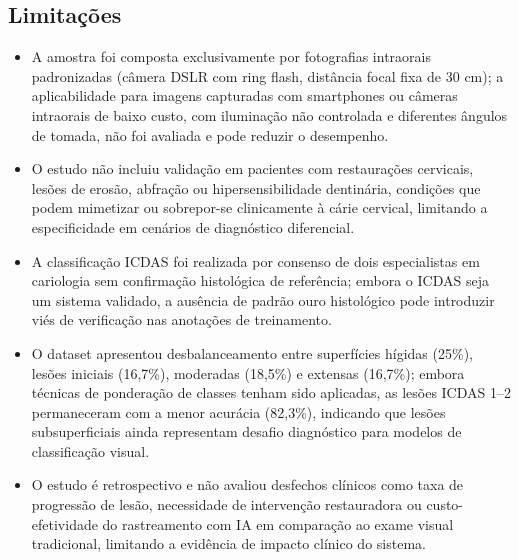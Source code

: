 \subsection{Limitações}
\begin{itemize}
  \item A amostra foi composta exclusivamente por fotografias
        intraorais padronizadas (câmera DSLR com ring flash, distância
        focal fixa de 30 cm); a aplicabilidade para imagens capturadas
        com smartphones ou câmeras intraorais de baixo custo, com
        iluminação não controlada e diferentes ângulos de tomada, não
        foi avaliada e pode reduzir o desempenho.
  \item O estudo não incluiu validação em pacientes com restaurações
        cervicais, lesões de erosão, abfração ou hipersensibilidade
        dentinária, condições que podem mimetizar ou sobrepor-se
        clinicamente à cárie cervical, limitando a especificidade
        em cenários de diagnóstico diferencial.
  \item A classificação ICDAS foi realizada por consenso de dois
        especialistas em cariologia sem confirmação histológica de
        referência; embora o ICDAS seja um sistema validado, a
        ausência de padrão ouro histológico pode introduzir viés de
        verificação nas anotações de treinamento.
  \item O dataset apresentou desbalanceamento entre superfícies
        hígidas (25\%), lesões iniciais (16,7\%), moderadas (18,5\%)
        e extensas (16,7\%); embora técnicas de ponderação de classes
        tenham sido aplicadas, as lesões ICDAS 1--2 permaneceram com
        a menor acurácia (82,3\%), indicando que lesões
        subsuperficiais ainda representam desafio diagnóstico para
        modelos de classificação visual.
  \item O estudo é retrospectivo e não avaliou desfechos clínicos
        como taxa de progressão de lesão, necessidade de intervenção
        restauradora ou custo-efetividade do rastreamento com IA em
        comparação ao exame visual tradicional, limitando a evidência
        de impacto clínico do sistema.
\end{itemize}

